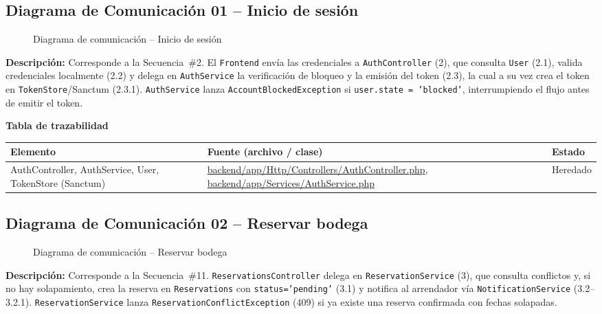 \subsection{Diagrama de Comunicación 01 -- Inicio de sesión}
\begin{figure}[H]
    \centering
    \caption{Diagrama de comunicación -- Inicio de sesión}
    \label{fig:com01}
\end{figure}
{\sloppy\noindent\textbf{Descripción:} Corresponde a la Secuencia~\#2. El \texttt{Frontend} envía las credenciales a \texttt{AuthController} (2), que consulta \texttt{User} (2.1), valida credenciales localmente (2.2) y delega en \texttt{AuthService} la verificación de bloqueo y la emisión del token (2.3), la cual a su vez crea el token en \texttt{TokenStore}/Sanctum (2.3.1). \texttt{AuthService} lanza \texttt{AccountBlockedException} si \texttt{user.state = 'blocked'}, interrumpiendo el flujo antes de emitir el token.\par}

\bigskip
\noindent\textbf{Tabla de trazabilidad}
\begin{longtable}{|L{5cm}|L{7.5cm}|M{2cm}|}
\hline
{} \textbf{Elemento} & \textbf{Fuente (archivo / clase)} & \textbf{Estado} \\ \hline
\endhead
AuthController, AuthService, User, TokenStore (Sanctum) & \url{backend/app/Http/Controllers/AuthController.php}, \url{backend/app/Services/AuthService.php} & Heredado \\ \hline
\end{longtable}
\clearpage

\subsection{Diagrama de Comunicación 02 -- Reservar bodega}
\begin{figure}[H]
    \centering
    \caption{Diagrama de comunicación -- Reservar bodega}
    \label{fig:com02}
\end{figure}
{\sloppy\noindent\textbf{Descripción:} Corresponde a la Secuencia~\#11. \texttt{ReservationsController} delega en \texttt{ReservationService} (3), que consulta conflictos y, si no hay solapamiento, crea la reserva en \texttt{Reservations} con \texttt{status='pending'} (3.1) y notifica al arrendador vía \texttt{NotificationService} (3.2--3.2.1). \texttt{ReservationService} lanza \texttt{ReservationConflictException} (409) si ya existe una reserva confirmada con fechas solapadas.\par}

